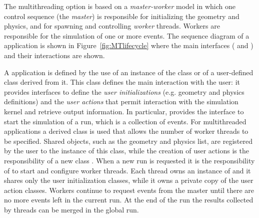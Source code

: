 The multithreading option is based on a {\it master-worker} model in which one 
control sequence (the {\it master}) is responsible for initializing the geometry
and physics, and for spawning and controlling {\it worker} threads.  Workers are 
responsible for the simulation of one or more events.  The sequence diagram of a
\Gfour{} application is shown in Figure~\ref{fig:MTlifecycle} where the main 
interfaces ( and ) and their 
interactions are shown.

A \Gfour{} application is defined by the use of an instance of the 
 class or of a user-defined class derived from
it.  This class defines the main interaction with the user: it provides 
interfaces to define the {\it user initializations} (e.g. geometry and physics 
definitions) and the {\it user actions} that permit interaction with the 
simulation kernel and retrieve output information.  In particular,
 provides the interface to start the 
simulation of a run, which is a collection of events.  For multithreaded 
applications a derived class  is used 
that allows the number of worker threads to be specified.  Shared objects, such
as the geometry and physics list, are registered by the user to the instance of
this class, while the creation of user actions is the responsibility of a new 
class .  When a new run is requested it is 
the responsibility of  to start and configure worker 
threads.  Each thread owns an instance of  and it 
shares only the user initialization classes, while it owns a private copy of the
user action classes.  Workers continue to request events from the master until 
there are no more events left in the current run.  At the end of the run the 
results collected by threads can be merged in the global run.

